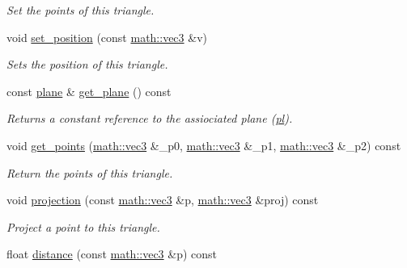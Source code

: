 \begin{DoxyCompactItemize}
\begin{DoxyCompactList}\small\item\em Set the points of this triangle. \end{DoxyCompactList}\item 
void \hyperlink{classphysim_1_1geometric_1_1triangle_a60c60f0260fff5402c546a01e7fb5d5f}{set\+\_\+position} (const \hyperlink{structphysim_1_1math_1_1vec3}{math\+::vec3} \&v)
\begin{DoxyCompactList}\small\item\em Sets the position of this triangle. \end{DoxyCompactList}\item 
\mbox{\label{classphysim_1_1geometric_1_1triangle_a6dc472435ad6f8f08ab8080e6b60e3d3}} 
const \hyperlink{classphysim_1_1geometric_1_1plane}{plane} \& \hyperlink{classphysim_1_1geometric_1_1triangle_a6dc472435ad6f8f08ab8080e6b60e3d3}{get\+\_\+plane} () const
\begin{DoxyCompactList}\small\item\em Returns a constant reference to the assiociated plane (\hyperlink{classphysim_1_1geometric_1_1triangle_af56be3b510d3a9996fbeab59ec26f584}{pl}). \end{DoxyCompactList}\item 
void \hyperlink{classphysim_1_1geometric_1_1triangle_aaf1c684ae7810629c3ca478c25303ffa}{get\+\_\+points} (\hyperlink{structphysim_1_1math_1_1vec3}{math\+::vec3} \&\+\_\+p0, \hyperlink{structphysim_1_1math_1_1vec3}{math\+::vec3} \&\+\_\+p1, \hyperlink{structphysim_1_1math_1_1vec3}{math\+::vec3} \&\+\_\+p2) const
\begin{DoxyCompactList}\small\item\em Return the points of this triangle. \end{DoxyCompactList}\item 
void \hyperlink{classphysim_1_1geometric_1_1triangle_abf4852436b554b0a220d1edde0689845}{projection} (const \hyperlink{structphysim_1_1math_1_1vec3}{math\+::vec3} \&p, \hyperlink{structphysim_1_1math_1_1vec3}{math\+::vec3} \&proj) const
\begin{DoxyCompactList}\small\item\em Project a point to this triangle. \end{DoxyCompactList}\item 
float \hyperlink{classphysim_1_1geometric_1_1triangle_a0fd4b6ef7082472c82b7e0d5d73f10fc}{distance} (const \hyperlink{structphysim_1_1math_1_1vec3}{math\+::vec3} \&p) const

\end{DoxyCompactItemize}
